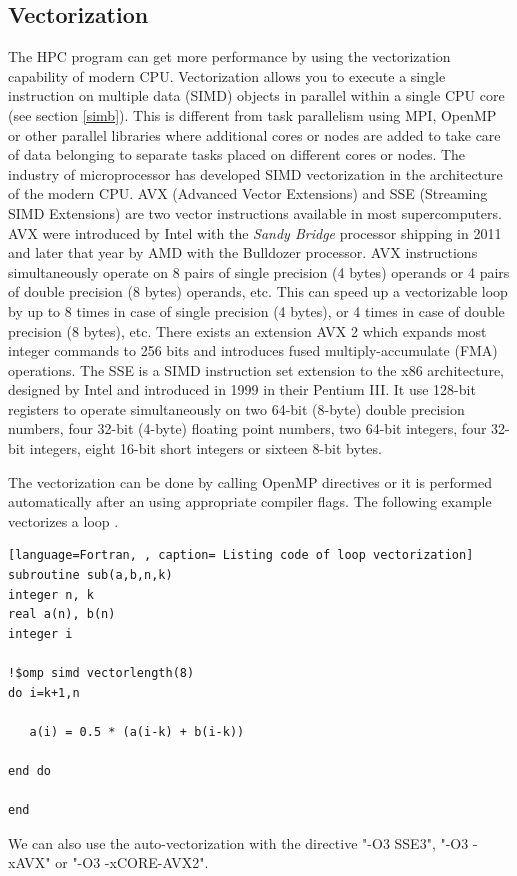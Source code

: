 \subsection{Vectorization}
The HPC program can get more performance by using the vectorization capability of modern CPU. Vectorization allows you to execute a single instruction on multiple data (SIMD) objects in parallel within a single CPU core (see section \ref{simb}). This is different from task parallelism using MPI, OpenMP or other parallel libraries where additional cores or nodes are added to take care of data belonging to separate tasks placed on different cores or nodes. The industry of microprocessor has developed SIMD vectorization in the architecture of the modern CPU. AVX (Advanced Vector Extensions) and SSE (Streaming SIMD Extensions) are two vector instructions available in most supercomputers. AVX were introduced by Intel with the\textit{ Sandy Bridge} processor shipping in 2011 and later that year by AMD with the Bulldozer processor.  AVX instructions simultaneously operate on 8 pairs of single precision (4 bytes) operands or 4 pairs of double precision (8 bytes) operands, etc. This can speed up a vectorizable loop by up to 8 times in case of single precision (4 bytes), or 4 times in case of double precision (8 bytes), etc. There exists an extension AVX 2 which expands most integer commands to 256 bits and introduces fused multiply-accumulate (FMA) operations. The SSE is a SIMD instruction set extension to the x86 architecture, designed by Intel and introduced in 1999 in their Pentium III. It use 128-bit registers to operate simultaneously on two 64-bit (8-byte) double precision numbers, four 32-bit (4-byte) floating point numbers, two 64-bit integers, four 32-bit integers, eight 16-bit short integers or sixteen 8-bit bytes. 

The vectorization can be done by calling OpenMP directives or it is performed automatically after an using appropriate compiler flags. The following example vectorizes a loop .
\begin{lstlisting}[language=Fortran, , caption= Listing code of loop vectorization]
subroutine sub(a,b,n,k)
integer n, k
real a(n), b(n)
integer i

!$omp simd vectorlength(8)
do i=k+1,n

   a(i) = 0.5 * (a(i-k) + b(i-k))

end do

end
\end{lstlisting}

We can also use the auto-vectorization with the directive "-O3 SSE3", "-O3 -xAVX" or "-O3 -xCORE-AVX2".  
